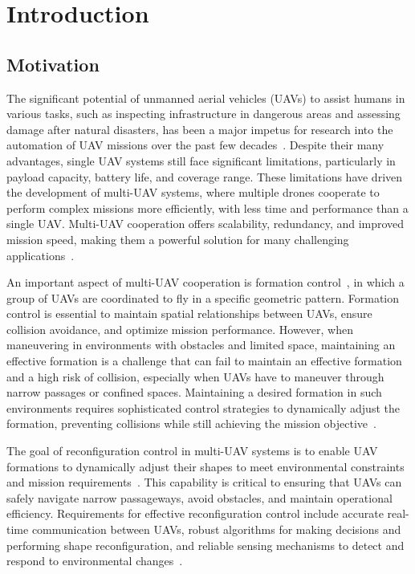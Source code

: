\chapter{Introduction}\label{chap1}

\section{Motivation}\label{sec11}
The significant potential of unmanned aerial vehicles (UAVs) to assist humans in various tasks, such as inspecting infrastructure in dangerous areas and assessing damage after natural disasters, has been a major impetus for research into the automation of UAV missions over the past few decades~\cite{9306908}. Despite their many advantages, single UAV systems still face significant limitations, particularly in payload capacity, battery life, and coverage range. These limitations have driven the development of multi-UAV systems, where multiple drones cooperate to perform complex missions more efficiently, with less time and performance than a single UAV. Multi-UAV cooperation offers scalability, redundancy, and improved mission speed, making them a powerful solution for many challenging applications~\cite{Skorobogatov2020,Tang2022}.

An important aspect of multi-UAV cooperation is formation control~\cite{Oh2015}, in which a group of UAVs are coordinated to fly in a specific geometric pattern. Formation control is essential to maintain spatial relationships between UAVs, ensure collision avoidance, and optimize mission performance. However, when maneuvering in environments with obstacles and limited space, maintaining an effective formation is a challenge that can fail to maintain an effective formation and a high risk of collision, especially when UAVs have to maneuver through narrow passages or confined spaces. Maintaining a desired formation in such environments requires sophisticated control strategies to dynamically adjust the formation, preventing collisions while still achieving the mission objective~\cite{Huang2019,Rastgoftar2019}.

The goal of reconfiguration control in multi-UAV systems is to enable UAV formations to dynamically adjust their shapes to meet environmental constraints and mission requirements~\cite{Oh2015,Huang2019}. This capability is critical to ensuring that UAVs can safely navigate narrow passageways, avoid obstacles, and maintain operational efficiency. Requirements for effective reconfiguration control include accurate real-time communication between UAVs, robust algorithms for making decisions and performing shape reconfiguration, and reliable sensing mechanisms to detect and respond to environmental changes~\cite{736776,Berlinger2021,9565893,Elkilany2020,AlonsoMora2018,Vsrhelyi2018,7828016,Wu2020}.

